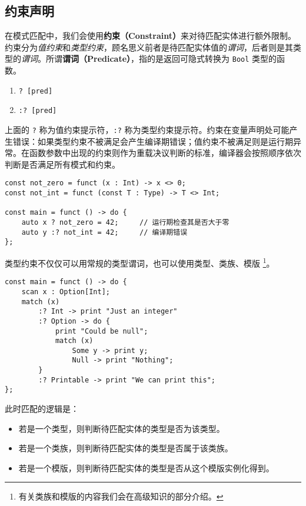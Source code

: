 \subsection{约束声明}

在模式匹配中，我们会使用\textbf{约束（Constraint）}来对待匹配实体进行额外限制。约束分为\emph{值约束}和\emph{类型约束}，顾名思义前者是待匹配实体值的\emph{谓词}，后者则是其类型的\emph{谓词}。所谓\textbf{谓词（Predicate）}，指的是返回可隐式转换为 \lstinline!Bool! 类型的函数。

\begin{grammar}[约束 \texttt{[constr]}] \label{grm:constr}
\begin{enumerate}
    \item \lstinline!? [pred]!
    \item \lstinline!:? [pred]!
\end{enumerate}
\end{grammar}

上面的 \lstinline!?! 称为值约束提示符，\lstinline!:?! 称为类型约束提示符。约束在变量声明处可能产生错误：如果类型约束不被满足会产生编译期错误；值约束不被满足则是运行期异常。在函数参数中出现的约束则作为重载决议判断的标准，编译器会按照顺序依次判断是否满足所有模式和约束。

\begin{lstlisting}
const not_zero = funct (x : Int) -> x <> 0;
const not_int = funct (const T : Type) -> T <> Int;

const main = funct () -> do {
    auto x ? not_zero = 42;     // 运行期检查其是否大于零
    auto y :? not_int = 42;     // 编译期错误
};
\end{lstlisting}

类型约束不仅仅可以用常规的类型谓词，也可以使用类型、类族、模版 \footnote{有关类族和模版的内容我们会在高级知识的部分介绍。}。

\begin{lstlisting}
const main = funct () -> do {
    scan x : Option[Int];
    match (x)
        :? Int -> print "Just an integer"
        :? Option -> do {
            print "Could be null";
            match (x)
                Some y -> print y;
                Null -> print "Nothing";
        }
        :? Printable -> print "We can print this";
};
\end{lstlisting}

此时匹配的逻辑是：

\begin{itemize}
    \item 若是一个类型，则判断待匹配实体的类型是否为该类型。
    \item 若是一个类族，则判断待匹配实体的类型是否属于该类族。
    \item 若是一个模版，则判断待匹配实体的类型是否从这个模版实例化得到。
\end{itemize}


